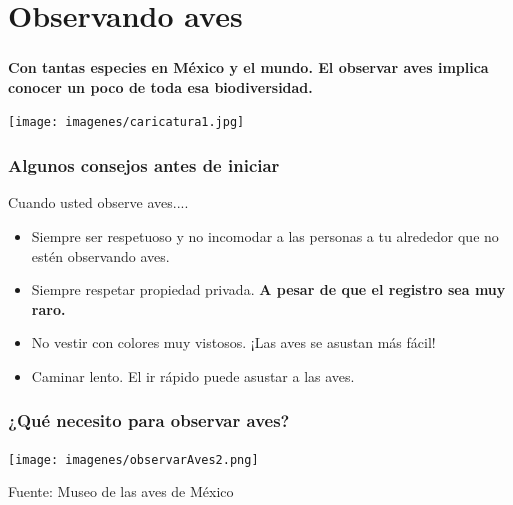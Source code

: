 \documentclass[compress]{beamer}
\begin{document}
\section{Observando aves}
{
  \begin{frame}
    \frametitle{}
    \begin{center}
      \textbf{
      Con tantas especies en México y el mundo.
      El observar aves implica conocer un poco de toda esa biodiversidad.}
    \end{center}
         
     \begin{center}
      \texttt{[image: imagenes/caricatura1.jpg]}\\
      \captionof{}{}
    \end{center}



 \end{frame}
}


{
  \begin{frame}
    \frametitle{Algunos consejos antes de iniciar}
    Cuando usted observe aves....
    \begin{itemize}
    \pause
     \item Siempre ser respetuoso y no incomodar a las personas a 
	   tu alrededor que no estén observando aves.
      \pause
     \item Siempre respetar propiedad privada. 
	   \textbf {A pesar de que el registro sea muy raro.}
      \pause
     \item No vestir con colores muy vistosos. ¡Las aves se asustan más fácil!
     \pause
     \item Caminar lento. El ir rápido puede asustar a las aves.
    \end{itemize}
 \end{frame}
}


{
  \begin{frame}
    \frametitle{¿Qué necesito para observar aves?}
    \begin{center}
      \texttt{[image: imagenes/observarAves2.png]}\\
      \captionof{}{}
    \end{center}

    \tiny{Fuente: Museo de las aves de México}
   
 \end{frame}
}
\end{document}
